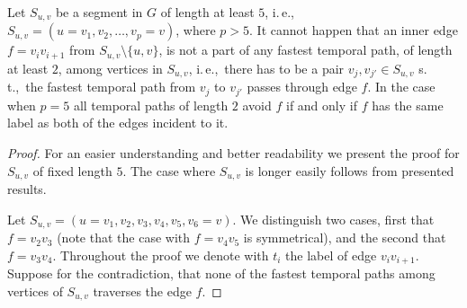 \documentclass[a4paper,UKenglish,cleveref, autoref, thm-restate]{lipics-v2021}
\newcommand{\ie}{i.\,e.,\ }
\renewcommand{\st}{s.\,t.,\ }
\begin{document}
\begin{lemma}\label{lemma:FPT-noUndeterminedEdgeInSegment}
Let $S_{u,v}$ be a segment in $G$ of length at least $5$,
\ie $S_{u,v}= (u=v_1,v_2, \dots, v_p = v)$, where $p > 5$.
It cannot happen that an inner edge $f = v_i v_{i+1}$ from $S_{u,v} \setminus \{u,v\}$,
is not a part of any fastest temporal path, of length at least $2$, among vertices in $S_{u,v}$,
\ie there has to be a pair $v_j, v_{j'} \in S_{u,v}$ \st the fastest temporal path from $v_j$ to $v_{j'}$ passes through edge $f$.
In the case when $p = 5$ all temporal paths of length $2$ avoid $f$ if and only if $f$ has the same label as both of the edges incident to it.
\end{lemma}

\begin{proof}
    For an easier understanding and better readability we present the proof for $S_{u,v}$ of fixed length $5$.
    The case where $S_{u,v}$ is longer easily follows from presented results.

    Let $S_{u,v} = (u=v_1,v_2, v_3, v_4, v_5, v_6=v)$.
    We distinguish two cases, first that $f = v_2v_3$ (note that the case with $f = v_4v_5$ is symmetrical),
    and the second that  $f = v_3v_4$.
    Throughout the proof we denote with $t_i$ the label of edge $v_i v_{i+1}$.
    Suppose for the contradiction, that none of the fastest temporal paths among vertices of $S_{u,v}$ traverses the edge $f$.


\end{proof}
\end{document}
